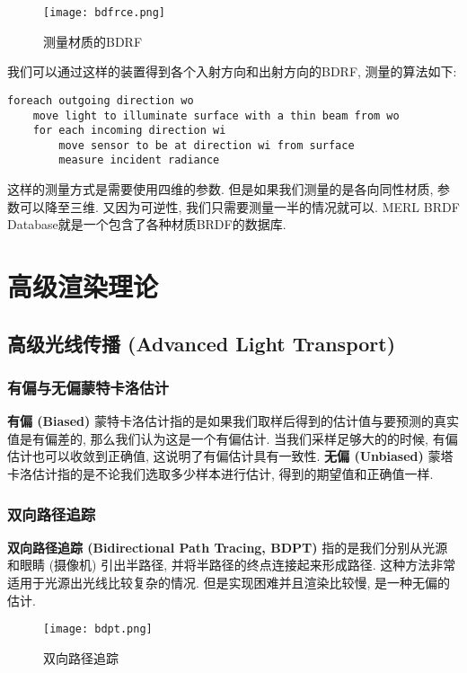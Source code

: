 \begin{figure}[H]
	\centering
	\texttt{[image: bdfrce.png]}
	\caption{测量材质的BDRF}
	\label{fig:bdrfce}
\end{figure}

我们可以通过这样的装置得到各个入射方向和出射方向的BDRF, 测量的算法如下: 
\begin{lstlisting}[caption=BDRF的测量]
foreach outgoing direction wo
	move light to illuminate surface with a thin beam from wo
	for each incoming direction wi
		move sensor to be at direction wi from surface
		measure incident radiance
\end{lstlisting}

这样的测量方式是需要使用四维的参数. 但是如果我们测量的是各向同性材质, 参数可以降至三维. 又因为可逆性, 我们只需要测量一半的情况就可以. MERL BRDF Database就是一个包含了各种材质BRDF的数据库. 


\chapter{高级渲染理论}

\section{高级光线传播 (Advanced Light Transport) }

\subsection{有偏与无偏蒙特卡洛估计}

\textbf{有偏 (Biased) }蒙特卡洛估计指的是如果我们取样后得到的估计值与要预测的真实值是有偏差的, 那么我们认为这是一个有偏估计. 当我们采样足够大的的时候, 有偏估计也可以收敛到正确值, 这说明了有偏估计具有一致性. \textbf{无偏 (Unbiased) }蒙塔卡洛估计指的是不论我们选取多少样本进行估计, 得到的期望值和正确值一样. 

\subsection{双向路径追踪}

\textbf{双向路径追踪 (Bidirectional Path Tracing, BDPT) }指的是我们分别从光源和眼睛 (摄像机) 引出半路径, 并将半路径的终点连接起来形成路径. 这种方法非常适用于光源出光线比较复杂的情况. 但是实现困难并且渲染比较慢, 是一种无偏的估计. 

\begin{figure}[H]
	\centering
	\texttt{[image: bdpt.png]}
	\caption{双向路径追踪}
	\label{fig:bdpt}
\end{figure}

